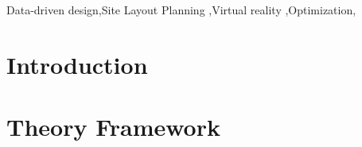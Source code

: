 \documentclass[final,5p,times]{elsarticle}
\begin{document}
\begin{frontmatter}
\begin{highlights}

\end{highlights}

\begin{keyword}
Data-driven design\sep Site Layout Planning \sep Virtual reality \sep Optimization\sep

\end{keyword}

\end{frontmatter}
%
\begin{linenumbers}


\section{Introduction}
\label{sec:1Introduction}


\section{Theory Framework}
\label{sec:Theory Framework}


\end{linenumbers}

\pagebreak
\clearpage

    
    
\end{document}
